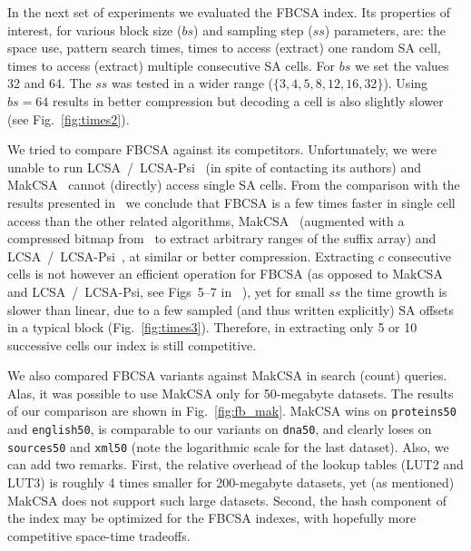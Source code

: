\documentclass{cai}
\begin{document}
In the next set of experiments we evaluated the FBCSA index. 
Its properties of interest, for various block size ($bs$) and 
sampling step ($ss$) parameters, are: the space use, 
pattern search times, times to access (extract) one random SA cell, 
times to access (extract) multiple consecutive SA cells. 
For $bs$ we set the values 32 and 64.
The $ss$ was tested in a wider range ($\{3, 4, 5, 8, 12, 16, 32\}$).
Using $bs = 64$ results in better compression but decoding a cell 
is also slightly slower (see Fig.~\ref{fig:times2}).

We tried to compare FBCSA against its competitors. 
Unfortunately, we were unable to run LCSA~/~LCSA-Psi~\cite{GNFjea14}
(in spite of contacting its authors) 
and MakCSA~\cite{DBLP:journals/fuin/Makinen03} cannot (directly) 
access single SA cells.
From the comparison with the results presented in~\cite[Sect.~4]{GNFjea14} 
we conclude that FBCSA is a few times faster in single cell access 
than the other related algorithms, MakCSA~\cite{DBLP:journals/fuin/Makinen03} 
(augmented with a compressed bitmap from~\cite{RamanRR02} to extract arbitrary 
ranges of the suffix array) and LCSA~/~LCSA-Psi~\cite{GNFjea14}, 
at similar or better compression.
Extracting $c$ consecutive cells is not however an efficient operation for FBCSA 
(as opposed to MakCSA and LCSA~/~LCSA-Psi, see Figs~5--7 in ~\cite{GNFjea14}), 
yet for small $ss$ the time growth is slower than linear, due to a few sampled 
(and thus written explicitly) SA offsets in a typical block (Fig.~\ref{fig:times3}).
Therefore, in extracting only 5 or 10 successive cells our index is still 
competitive.



We also compared FBCSA variants against MakCSA in search (count) queries.
Alas, it was possible to use MakCSA only for 50-megabyte datasets.
The results of our comparison are shown in Fig.~\ref{fig:fb_mak}.
MakCSA wins on \texttt{proteins50} and \texttt{english50}, 
is comparable to our variants on \texttt{dna50}, and 
clearly loses on \texttt{sources50} and \texttt{xml50} 
(note the logarithmic scale for the last dataset).
Also, we can add two remarks.
First, the relative overhead of the lookup tables (LUT2 and LUT3) is roughly 
4 times smaller for 200-megabyte datasets, yet (as mentioned) 
MakCSA does not support such large datasets.
Second, the hash component of the index may be optimized for the FBCSA indexes, 
with hopefully more competitive space-time tradeoffs.
\end{document}
